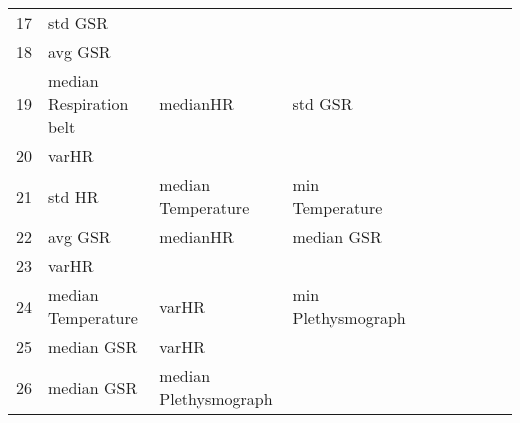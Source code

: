 \begin{landscape}
\begin{table}[]
\begin{tabular}{l|llllllll}
17       & std GSR                 &                       &                         &                         &                         &                       &                      &          &                      &        \\
18       & avg GSR                 &                       &                         &                         &                         &                       &                      &          &                      &        \\
19       & median Respiration belt & medianHR              & std GSR                 &                         &                         &                       &                      &          &                      &        \\
20       & varHR                   &                       &                         &                         &                         &                       &                      &          &                      &        \\
21       & std HR                  & median Temperature    & min Temperature         &                         &                         &                       &                      &          &                      &        \\
22       & avg GSR                 & medianHR              & median GSR              &                         &                         &                       &                      &          &                      &        \\
23       & varHR                   &                       &                         &                         &                         &                       &                      &          &                      &        \\
24       & median Temperature      & varHR                 & min Plethysmograph      &                         &                         &                       &                      &          &                      &        \\
25       & median GSR              & varHR                 &                         &                         &                         &                       &                      &          &                      &        \\
26       & median GSR              & median Plethysmograph &                         &                         &                         &                       &                      &          &                      &        \\

\end{tabular}
\end{table}
\end{landscape}
